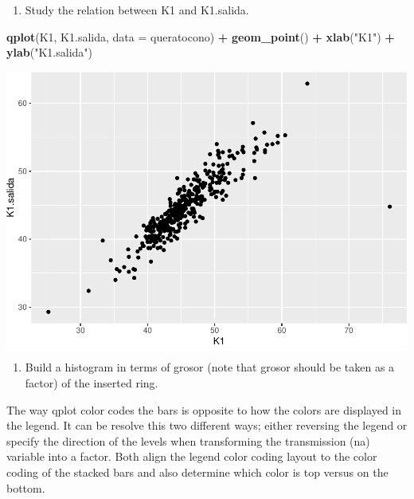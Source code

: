 \documentclass[]{article}
\newenvironment{Shaded}{\begin{snugshade}}{\end{snugshade}}
\newcommand{\DataTypeTok}[1]{\textcolor[rgb]{0.13,0.29,0.53}{#1}}
\newcommand{\KeywordTok}[1]{\textcolor[rgb]{0.13,0.29,0.53}{\textbf{#1}}}
\newcommand{\NormalTok}[1]{#1}
\newcommand{\OperatorTok}[1]{\textcolor[rgb]{0.81,0.36,0.00}{\textbf{#1}}}
\newcommand{\StringTok}[1]{\textcolor[rgb]{0.31,0.60,0.02}{#1}}
\providecommand{\tightlist}{%
  \setlength{\itemsep}{0pt}\setlength{\parskip}{0pt}}
\begin{document}
\begin{enumerate}
\def\labelenumi{\arabic{enumi}.}
\setcounter{enumi}{2}
\tightlist
\item
  Study the relation between K1 and K1.salida.
\end{enumerate}

\begin{Shaded}
\begin{Highlighting}[]
\KeywordTok{qplot}\NormalTok{(K1, K1.salida, }\DataTypeTok{data =}\NormalTok{ queratocono) }\OperatorTok{+}
\StringTok{  }\KeywordTok{geom_point}\NormalTok{() }\OperatorTok{+}\StringTok{ }
\StringTok{  }\KeywordTok{xlab}\NormalTok{(}\StringTok{"K1"}\NormalTok{) }\OperatorTok{+}\StringTok{ }\KeywordTok{ylab}\NormalTok{(}\StringTok{"K1.salida"}\NormalTok{)}
\end{Highlighting}
\end{Shaded}

\includegraphics{document_files/figure-latex/unnamed-chunk-5-1.pdf}

\begin{enumerate}
\def\labelenumi{\arabic{enumi}.}
\setcounter{enumi}{3}
\tightlist
\item
  Build a histogram in terms of grosor (note that grosor should be taken
  as a factor) of the inserted ring.
\end{enumerate}

The way qplot color codes the bars is opposite to how the colors are
displayed in the legend. It can be resolve this two different ways;
either reversing the legend or specify the direction of the levels when
transforming the transmission (na) variable into a factor. Both align
the legend color coding layout to the color coding of the stacked bars
and also determine which color is top versus on the bottom.
\end{document}
